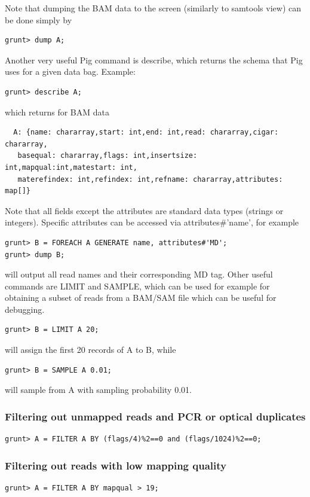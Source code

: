 Note that dumping the BAM data to the screen (similarly to samtools view)
can be done simply by
\begin{lstlisting}
grunt> dump A;
\end{lstlisting}
Another very useful Pig command is describe, which returns the schema that Pig
uses for a given data bag. Example:
\begin{lstlisting}
grunt> describe A;
\end{lstlisting}
which returns for BAM data
\begin{lstlisting}  
  A: {name: chararray,start: int,end: int,read: chararray,cigar: chararray,
   basequal: chararray,flags: int,insertsize: int,mapqual:int,matestart: int,
   materefindex: int,refindex: int,refname: chararray,attributes: map[]}
\end{lstlisting}
Note that all fields except the attributes are standard data types (strings
or integers). Specific attributes can be accessed via attributes\#'name', for
example
\begin{lstlisting} 
grunt> B = FOREACH A GENERATE name, attributes#'MD';
grunt> dump B;
\end{lstlisting}
will output all read names and their corresponding MD tag.
Other useful commands are LIMIT and SAMPLE, which can be used for example for obtaining
a subset of reads from a BAM/SAM file which can be useful for debugging.
\begin{lstlisting} 
grunt> B = LIMIT A 20;
\end{lstlisting}
will assign the first 20 records of A to B, while
\begin{lstlisting}
grunt> B = SAMPLE A 0.01;
\end{lstlisting}
will sample from A with sampling probability 0.01.

\subsubsection{Filtering out unmapped reads and PCR or optical duplicates}
\begin{lstlisting}
grunt> A = FILTER A BY (flags/4)%2==0 and (flags/1024)%2==0;
\end{lstlisting}

\subsubsection{Filtering out reads with low mapping quality}
\begin{lstlisting}
grunt> A = FILTER A BY mapqual > 19;
\end{lstlisting}
